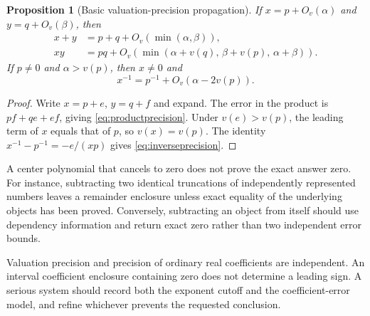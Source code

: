\documentclass[11pt,letterpaper]{article}
\newtheorem{proposition}[theorem]{Proposition}
\theoremstyle{definition}
\newcommand{\Ov}[1]{O_v(#1)}
\numberwithin{equation}{section}
\begin{document}
\begin{proposition}[Basic valuation-precision propagation]\label{prop:precision}
If $x=p+\Ov{\alpha}$ and $y=q+\Ov{\beta}$, then
\begin{align}
 x+y&=p+q+\Ov{\min(\alpha,\beta)},\\
 xy&=pq+\Ov{\min(\alpha+v(q),\,\beta+v(p),\,\alpha+\beta)}.
 \label{eq:productprecision}
\end{align}
If $p\ne0$ and $\alpha>v(p)$, then $x\ne0$ and
\begin{equation}\label{eq:inverseprecision}
 x^{-1}=p^{-1}+\Ov{\alpha-2v(p)}.
\end{equation}
\end{proposition}
\begin{proof}
Write $x=p+e$, $y=q+f$ and expand. The error in the product is $pf+qe+ef$, giving \eqref{eq:productprecision}. Under $v(e)>v(p)$, the leading term of $x$ equals that of $p$, so $v(x)=v(p)$. The identity $x^{-1}-p^{-1}=-e/(xp)$ gives \eqref{eq:inverseprecision}.
\end{proof}
A center polynomial that cancels to zero does not prove the exact answer zero. For instance, subtracting two identical truncations of independently represented numbers leaves a remainder enclosure unless exact equality of the underlying objects has been proved. Conversely, subtracting an object from itself should use dependency information and return exact zero rather than two independent error bounds.

Valuation precision and precision of ordinary real coefficients are independent. An interval coefficient enclosure containing zero does not determine a leading sign. A serious system should record both the exponent cutoff and the coefficient-error model, and refine whichever prevents the requested conclusion.
\end{document}
